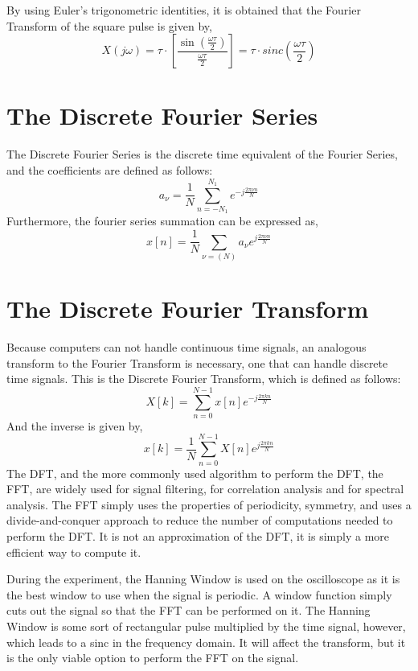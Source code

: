By using Euler's trigonometric identities, it is obtained that the Fourier Transform of the square pulse is given by,
\begin{equation}
    X(j\omega) = \tau \cdot \left[\frac{\sin(\frac{\omega \tau}{2})}{\frac{\omega \tau}{2}}\right] = \tau \cdot sinc\left(\frac{\omega \tau}{2}\right)
\end{equation}
\section{The Discrete Fourier Series}
The Discrete Fourier Series is the discrete time equivalent of the Fourier Series, and the coefficients are defined as follows:
\begin{equation}
    a_\nu = \frac{1}{N}\sum_{n=-N_1}^{N_1}e^{-j\frac{2\pi\nu n}{N}}
\end{equation}
Furthermore, the fourier series summation can be expressed as,
\begin{equation}
    x[n] = \frac{1}{N}\sum_{\nu=(N)}a_\nu e^{j\frac{2\pi\nu n}{N}}
\end{equation}
\section{The Discrete Fourier Transform}
Because computers can not handle continuous time signals, an analogous transform to the Fourier Transform is necessary, one that can handle discrete time signals. This is the Discrete Fourier Transform, which is defined as follows:
\begin{equation}
    X[k] = \sum_{n=0}^{N-1}x[n]e^{-j\frac{2\pi kn}{N}}
\end{equation}
And the inverse is given by,
\begin{equation}
    x[k] = \frac{1}{N}\sum_{n=0}^{N-1}X[n]e^{j\frac{2 \pi kn}{N}}
\end{equation}
The DFT, and the more commonly used algorithm to perform the DFT, the FFT, are widely used for signal filtering, for correlation analysis and for spectral analysis. The FFT simply uses the properties of periodicity, symmetry, and uses a divide-and-conquer approach to reduce the number of computations needed to perform the DFT. It is not an approximation of the DFT, it is simply a more efficient way to compute it.

During the experiment, the Hanning Window is used on the oscilloscope as it is the best window to use when the signal is periodic. A window function simply cuts out the signal so that the FFT can be performed on it. The Hanning Window is some sort of rectangular pulse multiplied by the time signal, however, which leads to a sinc in the frequency domain. It will affect the transform, but it is the only viable option to perform the FFT on the signal.